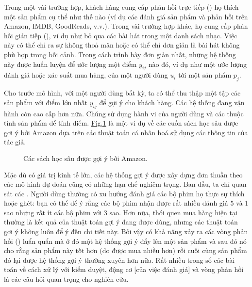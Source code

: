 \documentclass[letterpaper,11pt,english]{sphinxmanual}
\begin{document}
Trong một vài trường hợp, khách hàng cung cấp phản hồi trực tiếp
() họ thích một sản phẩm cụ thể như thế nào (ví dụ
các đánh giá sản phẩm và phản hồi trên Amazon, IMDB, GoodReads, v.v.).
Trong vài trường hợp khác, họ cung cấp phản hồi gián tiếp (), ví dụ như bỏ qua các bài hát trong một danh sách nhạc. Việc
này có thể chỉ ra sự không thoả mãn hoặc có thể chỉ đơn giản là bài hát
không phù hợp trong bối cảnh. Trong cách trình bày đơn giản nhất, những
hệ thống này được huấn luyện để ước lượng một điểm \(y_{ij}\) nào
đó, ví dụ như một ước lượng đánh giá hoặc xác suất mua hàng, của một
người dùng \(u_i\) tới một sản phẩm \(p_j\).



Cho trước mô hình, với một người dùng bất kỳ, ta có thể thu thập một tập
các sản phẩm với điểm lớn nhất \(y_{ij}\) để gợi ý cho khách hàng.
Các hệ thống đang vận hành còn cao cấp hơn nữa. Chúng sử dụng hành vi
của người dùng và các thuộc tính sản phẩm để tính điểm.
\hyperref[\detokenize{chapter_introduction/index_vn:fig-deeplearning-amazon}]{Fig.\@ \ref{\detokenize{chapter_introduction/index_vn:fig-deeplearning-amazon}}} là một ví dụ về các cuốn sách học
sâu được gợi ý bởi Amazon dựa trên các thuật toán cá nhân hoá sử dụng
các thông tin của tác giả.



\begin{figure}[H]
\centering
\capstart

\noindent{}
\caption{Các sách học sâu được gợi ý bởi Amazon.}\label{\detokenize{chapter_introduction/index_vn:id14}}\label{\detokenize{chapter_introduction/index_vn:fig-deeplearning-amazon}}\end{figure}



Mặc dù có giá trị kinh tế lớn, các hệ thống gợi ý được xây dựng đơn
thuần theo các mô hình dự đoán cũng có những hạn chế nghiêm trọng. Ban
đầu, ta chỉ quan sát các . Người dùng thường
có xu hướng đánh giá các bộ phim họ thực sự thích hoặc ghét: bạn có thể
để ý rằng các bộ phim nhận được rất nhiều đánh giá 5 và 1 sao nhưng rất
ít các bộ phim với 3 sao. Hơn nữa, thói quen mua hàng hiện tại thường là
kết quả của thuật toán gợi ý đang được dùng, nhưng các thuật toán gợi ý
không luôn để ý đến chi tiết này. Bởi vậy có khả năng xảy ra các vòng
phản hồi () luẩn quẩn mà ở đó một hệ thống gợi ý đẩy lên
một sản phẩm và sau đó nó cho rằng sản phẩm này tốt hơn (do được mua
nhiều hơn) rồi cuối cùng sản phẩm đó lại được hệ thống gợi ý thường
xuyên hơn nữa. Rất nhiều trong số các bài toán về cách xử lý với kiểm
duyệt, động cơ {[}của việc đánh giá{]} và vòng phản hồi là các câu hỏi quan
trọng cho nghiên cứu.
\end{document}
